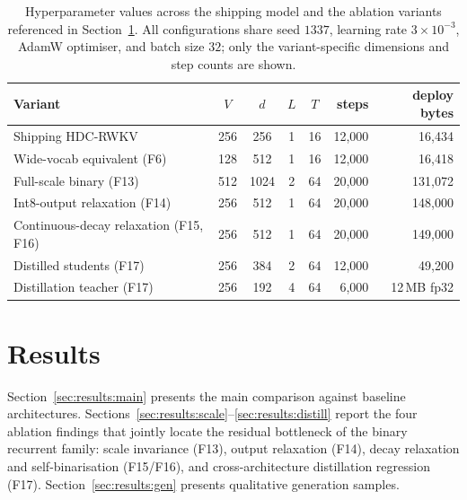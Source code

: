 \documentclass[runningheads]{llncs}
\begin{document}
\begin{table}[t]
\centering
\caption{Hyperparameter values across the shipping model and the
ablation variants referenced in Section~\ref{sec:results}. All
configurations share seed $1337$, learning rate $3\times 10^{-3}$,
AdamW optimiser, and batch size $32$; only the variant-specific
dimensions and step counts are shown.}
\label{tab:hparams}
\small
\begin{tabular}{@{}lccccrr@{}}
\toprule
Variant                                     & $V$ & $d$  & $L$ & $T$ & steps    & deploy bytes \\
\midrule
Shipping HDC-RWKV                           & 256 & 256  & 1   & 16  & 12{,}000 & 16{,}434 \\
Wide-vocab equivalent (F6)                  & 128 & 512  & 1   & 16  & 12{,}000 & 16{,}418 \\
Full-scale binary (F13)                     & 512 & 1024 & 2   & 64  & 20{,}000 & 131{,}072 \\
Int8-output relaxation (F14)                & 256 & 512  & 1   & 64  & 20{,}000 & 148{,}000 \\
Continuous-decay relaxation (F15, F16)      & 256 & 512  & 1   & 64  & 20{,}000 & 149{,}000 \\
Distilled students (F17)                    & 256 & 384  & 2   & 64  & 12{,}000 & 49{,}200 \\
Distillation teacher (F17)                  & 256 & 192  & 4   & 64  & \phantom{0}6{,}000 & 12\,MB fp32 \\
\bottomrule
\end{tabular}
\end{table}


\section{Results}
\label{sec:results}

Section~\ref{sec:results:main} presents the main comparison against
baseline architectures. Sections~\ref{sec:results:scale}--\ref{sec:results:distill}
report the four ablation findings that jointly locate the residual
bottleneck of the binary recurrent family: scale invariance (F13),
output relaxation (F14), decay relaxation and self-binarisation
(F15/F16), and cross-architecture distillation regression (F17).
Section~\ref{sec:results:gen} presents qualitative generation samples.
\end{document}
